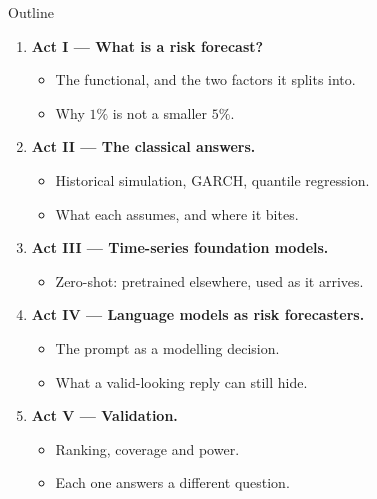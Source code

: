 \documentclass[9pt, aspectratio=169, t]{beamer}
\begin{document}
\begin{frame}{Outline}
  \begin{enumerate}
    \item \textbf{Act I --- What is a risk forecast?}
      \begin{itemize}
        \item The functional, and the two factors it splits into.
        \item Why $1\%$ is not a smaller $5\%$.
      \end{itemize}
    \item \textbf{Act II --- The classical answers.}
      \begin{itemize}
        \item Historical simulation, GARCH, quantile regression.
        \item What each assumes, and where it bites.
      \end{itemize}
    \item \textbf{Act III --- Time-series foundation models.}
      \begin{itemize}
        \item Zero-shot: pretrained elsewhere, used as it arrives.

      \end{itemize}
    \item \textbf{Act IV --- Language models as risk forecasters.}
      \begin{itemize}
        \item The prompt as a modelling decision.
        \item What a valid-looking reply can still hide.
      \end{itemize}
    \item \textbf{Act V --- Validation.}
      \begin{itemize}
        \item Ranking, coverage and power.
        \item Each one answers a different question.
      \end{itemize}
  \end{enumerate}
\end{frame}
\end{document}
